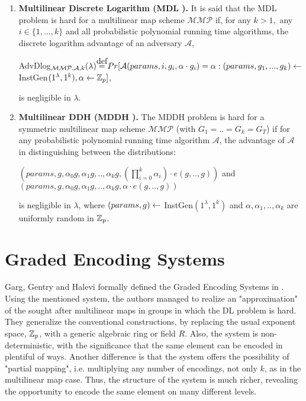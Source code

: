 \begin{enumerate}
	\item \textbf{Multilinear Discrete Logarithm (MDL \cite{GGH13}).} It is said that the MDL problem is hard for a multilinear map scheme $\mathcal{MMP}$ if, for any $k > 1, $ any $i\in \{1,...,k\}$ and all probabilistic polynomial running time algorithms, the discrete logarithm advantage of an adversary $\mathcal{A}$,
	\begin{center}
		AdvDlog$_{\mathcal{MMP, A}, k}(\lambda) \stackrel{\mathclap{\normalfont\mbox{def}}}{=} Pr[\mathcal{A}(params, i, g_i, \alpha \cdot g_i) = \alpha : (params, g_1, ..., g_k) \la$ InstGen$(1^\lambda, 1^k), \alpha \leftarrow {\mathbb Z}_p] $,
	\end{center}
	is negligible in $\lambda$.
	
	\item \textbf{Multilinear DDH (MDDH \cite{GGH13}).} The MDDH problem is hard for a symmetric multilinear map scheme $\mathcal{MMP}$ (with $G_1=..=G_k = G_T$) if for any probabilistic polynomial running time algorithm $\mathcal{A}$, the advantage of $\mathcal{A}$ in distinguishing between the distributions:
	
	\begin{center}
		$(params, g, \alpha_0g, \alpha_1g,..,\alpha_kg, (\displaystyle{\prod_{i=0}^{k}}\alpha_i)\cdot e(g,..,g))$ and \\
		$(params, g, \alpha_0g, \alpha_1g,..,\alpha_kg, \alpha \cdot e(g,..,g))$
	\end{center}
	is negligible in $\lambda$, where $(params, g)\leftarrow$ InstGen$(1^\lambda, 1^k)$ and $\alpha, \alpha_1, .., \alpha_k$ are uniformly random in ${\mathbb Z}_p$.
\end{enumerate}


\section{Graded Encoding Systems}
Garg, Gentry and Halevi formally defined the Graded Encoding Systems in \cite{GGH13}. Using the mentioned system, the authors managed to realize an "approximation" of the sought after multilinear maps in groups in which the DL problem is hard. \\

They generalize the conventional constructions, by replacing the usual exponent space, ${\mathbb Z}_p$, with a generic algebraic ring or field $R$. Also, the system is non-deterministic, with the significance that the same element can be encoded in plentiful of ways. Another difference is that the system offers the possibility of "partial mapping", i.e. multiplying any number of encodings, not only $k$, as in the multilinear map case. Thus, the structure of the system is much richer, revealing the opportunity to encode the same element on many different levels.\\

